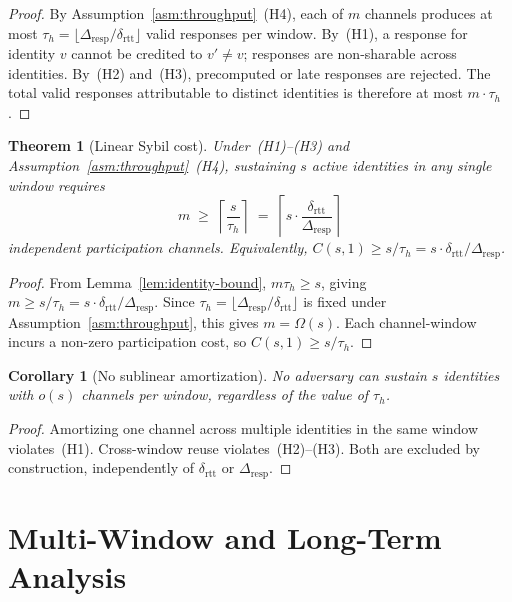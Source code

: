 \documentclass[11pt]{article}
\newtheorem{theorem}{Theorem}
\newtheorem{corollary}{Corollary}
\theoremstyle{remark}
\theoremstyle{plain}
\begin{document}
	\begin{proof}
		By Assumption~\ref{asm:throughput}~(H4), each of $m$ channels produces
		at most $\tau_h = \lfloor\Delta_{\mathrm{resp}}/\delta_{\mathrm{rtt}}\rfloor$
		valid responses per window. By~(H1), a response for identity $v$ cannot
		be credited to $v' \neq v$; responses are non-sharable across identities.
		By~(H2) and~(H3), precomputed or late responses are rejected.
		The total valid responses attributable to distinct identities is
		therefore at most $m \cdot \tau_h$.
	\end{proof}
	
	\begin{theorem}[Linear Sybil cost]
		\label{thm:linear-cost}
		Under~(H1)--(H3) and Assumption~\ref{asm:throughput}~(H4), sustaining
		$s$ active identities in any single window requires
		\[
		m \;\geq\; \left\lceil\frac{s}{\tau_h}\right\rceil
		\;=\; \left\lceil s \cdot
		\frac{\delta_{\mathrm{rtt}}}{\Delta_{\mathrm{resp}}}\right\rceil
		\]
		independent participation channels. Equivalently,
		$C(s,1) \geq s/\tau_h = s \cdot \delta_{\mathrm{rtt}}/\Delta_{\mathrm{resp}}$.
	\end{theorem}
	
	\begin{proof}
		From Lemma~\ref{lem:identity-bound}, $m\tau_h \ge s$, giving
		$m \ge s/\tau_h = s \cdot \delta_{\mathrm{rtt}}/\Delta_{\mathrm{resp}}$.
		Since $\tau_h = \lfloor\Delta_{\mathrm{resp}}/\delta_{\mathrm{rtt}}\rfloor$
		is fixed under Assumption~\ref{asm:throughput}, this gives $m = \Omega(s)$.
		Each channel-window incurs a non-zero participation cost, so
		$C(s,1) \geq s/\tau_h$.
	\end{proof}
	
	\begin{corollary}[No sublinear amortization]
		\label{cor:no-sublinear}
		No adversary can sustain $s$ identities with $o(s)$ channels per window,
		regardless of the value of $\tau_h$.
	\end{corollary}
	
	\begin{proof}
		Amortizing one channel across multiple identities in the same window
		violates~(H1). Cross-window reuse violates~(H2)--(H3). Both are
		excluded by construction, independently of $\delta_{\mathrm{rtt}}$
		or $\Delta_{\mathrm{resp}}$.
	\end{proof}
	
	
	\section{Multi-Window and Long-Term Analysis}
	\label{sec:multiwindow}
	
\end{document}
